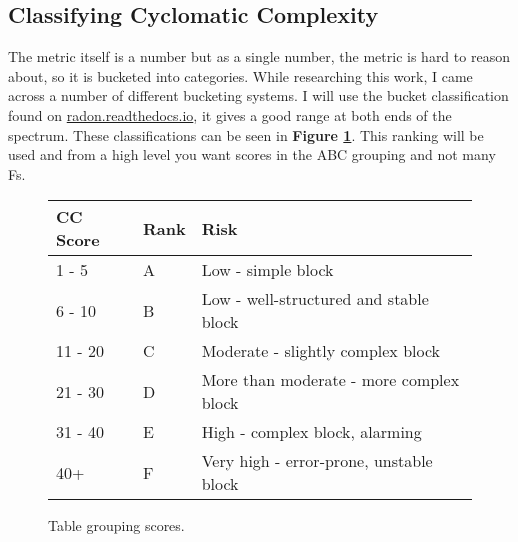 \subsection{Classifying Cyclomatic Complexity}
The metric itself is a number but as a single number, the metric is hard to reason about, so it is bucketed into categories.
While researching this work, I came across a number of different bucketing systems.
I will use the bucket classification found on \href{https://radon.readthedocs.io}{radon.readthedocs.io}, it gives a good range at both ends of the spectrum.
These classifications can be seen in \textbf{Figure \ref{tab:cc_scores}}.
This ranking will be used and from a high level you want scores in the ABC grouping and not many Fs.
\begin{figure}

	\begin{center}
		\begin{tabular}{|l|l|l|}
			\hline
			\textbf{CC Score} & \textbf{Rank} & \textbf{Risk}                           \\
			\hline
			1 - 5             & A             & Low - simple block                      \\
			\hline
			6 - 10            & B             & Low - well-structured and stable block  \\
			\hline
			11 - 20           & C             & Moderate - slightly complex block       \\
			\hline
			21 - 30           & D             & More than moderate - more complex block \\
			\hline
			31 - 40           & E             & High - complex block, alarming          \\
			\hline
			40+               & F             & Very high - error-prone, unstable block \\
			\hline
		\end{tabular}
	\end{center}
	\caption{Table grouping \cc scores.}
	\label{tab:cc_scores}
\end{figure}
